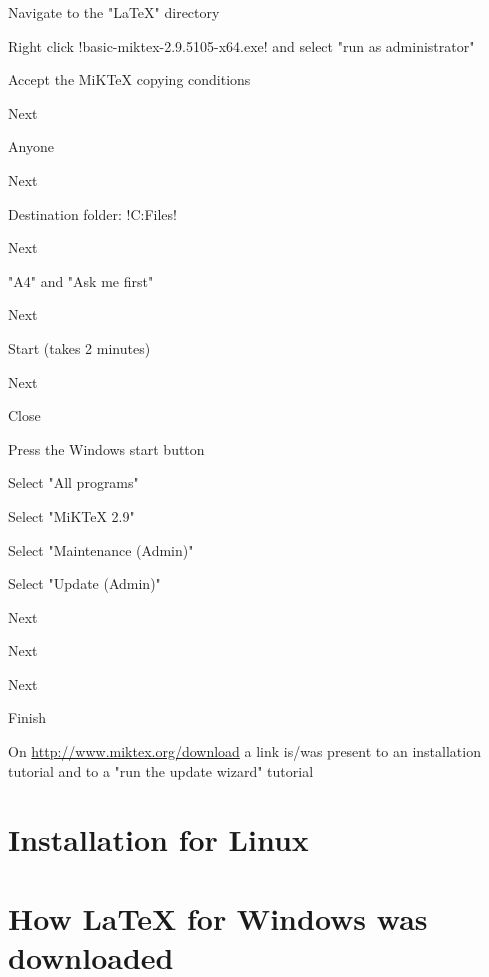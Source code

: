 \begin{enumerate*}
\item Navigate to the "LaTeX" directory
\item Right click !basic-miktex-2.9.5105-x64.exe! and select "run as
      administrator"
\item Accept the MiKTeX copying conditions
\item Next
\item Anyone
\item Next
\item Destination folder: !C:\Program Files!
\item Next
\item "A4" and "Ask me first"
\item Next
\item Start (takes 2 minutes)
\item Next
\item Close
\item Press the Windows start button
\item Select "All programs"
\item Select "MiKTeX 2.9"
\item Select "Maintenance (Admin)"
\item Select "Update (Admin)"
\item Next
\item Next
\item Next
\item Finish
\end{enumerate*}

\begin{Note}
On \url{http://www.miktex.org/download} a link is/was present to an
installation tutorial and to a "run the update wizard" tutorial
\end{Note}

\section{Installation for Linux}

\tbc

\section{How LaTeX for Windows was downloaded}

